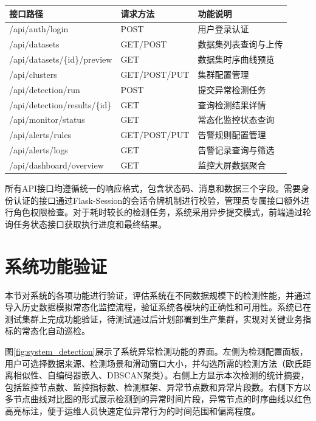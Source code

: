 \begin{table}[htbp]
    \centering
    \label{tab:api_design}
    \begin{tabular}{llp{5cm}}
        \toprule
        接口路径 & 请求方法 & 功能说明 \\
        \midrule
        /api/auth/login & POST & 用户登录认证 \\
        /api/datasets & GET/POST & 数据集列表查询与上传 \\
        /api/datasets/\{id\}/preview & GET & 数据集时序曲线预览 \\
        /api/clusters & GET/POST/PUT & 集群配置管理 \\
        /api/detection/run & POST & 提交异常检测任务 \\
        /api/detection/results/\{id\} & GET & 查询检测结果详情 \\
        /api/monitor/status & GET & 常态化监控状态查询 \\
        /api/alerts/rules & GET/POST/PUT & 告警规则配置管理 \\
        /api/alerts/logs & GET & 告警记录查询与筛选 \\
        /api/dashboard/overview & GET & 监控大屏数据聚合 \\
        \bottomrule
    \end{tabular}
\end{table}

所有API接口均遵循统一的响应格式，包含状态码、消息和数据三个字段。需要身份认证的接口通过Flask-Session的会话令牌机制进行校验，管理员专属接口额外进行角色权限检查。对于耗时较长的检测任务，系统采用异步提交模式，前端通过轮询任务状态接口获取执行进度和最终结果。

\section{系统功能验证}

本节对系统的各项功能进行验证，评估系统在不同数据规模下的检测性能，并通过导入历史数据模拟常态化监控流程，验证系统各模块的正确性和可用性。系统已在测试集群上完成功能验证，待测试通过后计划部署到生产集群，实现对关键业务指标的常态化自动巡检。

图\ref{fig:system_detection}展示了系统异常检测功能的界面。左侧为检测配置面板，用户可选择数据来源、检测场景和滑动窗口大小，并勾选所需的检测方法（欧氏距离相似性、自编码器嵌入、DBSCAN聚类）。右侧上方显示本次检测的统计摘要，包括监控节点数、监控指标数、检测框架、异常节点数和异常片段数。右侧下方以多节点曲线对比图的形式展示检测到的异常时间片段，异常节点的时序曲线以红色高亮标注，便于运维人员快速定位异常行为的时间范围和偏离程度。

